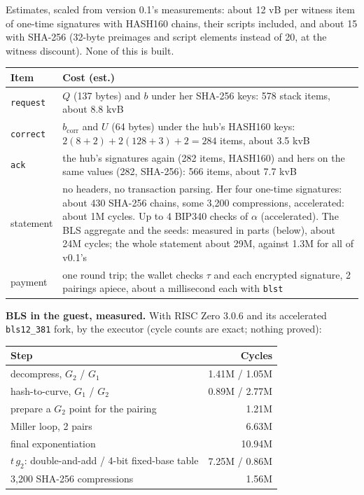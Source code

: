 \documentclass[11pt]{article}
\theoremstyle{plain}
\theoremstyle{definition}
\newcommand{\bcorr}{b_{\mathrm{corr}}}
\newcommand{\tx}[1]{\texttt{#1}}
\begin{document}
Estimates, scaled from version 0.1's measurements: about 12 vB per
witness item of one-time signatures with HASH160 chains, their scripts
included, and about 15 with SHA-256 (32-byte preimages and script
elements instead of 20, at the witness discount). None of this is
built.

\begin{center}
\begin{tabularx}{\linewidth}{lL}
\toprule
Item & Cost (est.) \\
\midrule
\tx{request} & $Q$ (137 bytes) and $b$ under her SHA-256 keys: 578 stack items, about 8.8 kvB \\
\tx{correct} & $\bcorr$ and $U$ (64 bytes) under the hub's HASH160 keys: $2(8 + 2) + 2(128 + 3) + 2 = 284$ items, about 3.5 kvB \\
\tx{ack} & the hub's signatures again (282 items, HASH160) and hers on the same values (282, SHA-256): 566 items, about 7.7 kvB \\
statement & no headers, no transaction parsing. Her four one-time signatures: about 430 SHA-256 chains, some 3,200 compressions, accelerated: about 1M cycles. Up to 4 BIP340 checks of $\alpha$ (accelerated). The BLS aggregate and the seeds: measured in parts (below), about 24M cycles; the whole statement about 29M, against 1.3M for all of v0.1's \\
payment & one round trip; the wallet checks $\tau$ and each encrypted signature, 2 pairings apiece, about a millisecond each with \tx{blst} \\
\bottomrule
\end{tabularx}
\end{center}

\textbf{BLS in the guest, measured.} With RISC Zero 3.0.6 and its
accelerated \tx{bls12\_381} fork, by the executor (cycle counts are
exact; nothing proved):

\begin{center}
\begin{tabular}{lr}
\toprule
Step & Cycles \\
\midrule
decompress, $G_2$ / $G_1$ & 1.41M / 1.05M \\
hash-to-curve, $G_1$ / $G_2$ & 0.89M / 2.77M \\
prepare a $G_2$ point for the pairing & 1.21M \\
Miller loop, 2 pairs & 6.63M \\
final exponentiation & 10.94M \\
$t\,g_2$: double-and-add / 4-bit fixed-base table & 7.25M / 0.86M \\
3,200 SHA-256 compressions & 1.56M \\
\bottomrule
\end{tabular}
\end{center}
\end{document}
